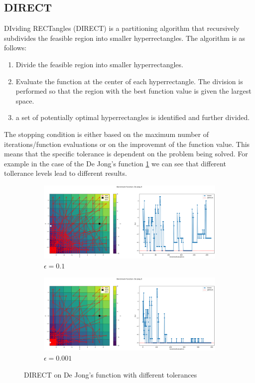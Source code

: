 \subsection{DIRECT}
DIviding RECTangles (DIRECT) is a partitioning algorithm that recursively subdivides the feasible region into smaller hyperrectangles. The algorithm is as follows:
\begin{enumerate}
    \item Divide the feasible region into smaller hyperrectangles.
    \item Evaluate the function at the center of each hyperrectangle. The division is performed so that the region with the best function value is given the largest space.
    \item a set of potentially optimal hyperrectangles is identified and further divided.
\end{enumerate}
The stopping condition is either based on the maximum number of iterations/function evaluations or on the improvemnt of the function value. This means that the specific tolerance is dependent on the problem being solved. For example in the case of the De Jong's function \ref{fig:dejong-tolerance} we can see that different tollerance levels lead to different results.
\begin{figure}[H]
    \begin{subfigure}{0.5\textwidth}
        \includegraphics[width=\textwidth]{lab2/imgs/di_dejong_eps_01.png}
        \caption{$\epsilon =0.1$}
    \end{subfigure}
    \begin{subfigure}{0.5\textwidth}
        \includegraphics[width=\textwidth]{lab2/imgs/di_dejong_eps_001.png}
        \caption{$\epsilon =0.001$}
    \end{subfigure}
    \caption{DIRECT on De Jong's function with different tolerances}
    \label{fig:dejong-tolerance}
\end{figure}
